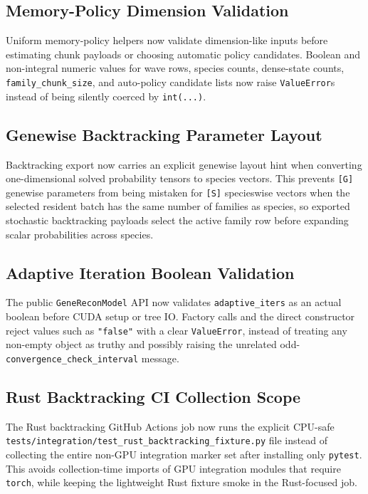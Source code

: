\documentclass[11pt]{article}
\begin{document}
\subsection{Memory-Policy Dimension Validation}

Uniform memory-policy helpers now validate dimension-like inputs before
estimating chunk payloads or choosing automatic policy candidates.  Boolean and
non-integral numeric values for wave rows, species counts, dense-state counts,
\texttt{family\_chunk\_size}, and auto-policy candidate lists now raise
\texttt{ValueError}s instead of being silently coerced by \texttt{int(...)}.

\subsection{Genewise Backtracking Parameter Layout}

Backtracking export now carries an explicit genewise layout hint when converting
one-dimensional solved probability tensors to species vectors.  This prevents
\texttt{[G]} genewise parameters from being mistaken for \texttt{[S]}
specieswise vectors when the selected resident batch has the same number of
families as species, so exported stochastic backtracking payloads select the
active family row before expanding scalar probabilities across species.

\subsection{Adaptive Iteration Boolean Validation}

The public \texttt{GeneReconModel} API now validates \texttt{adaptive\_iters}
as an actual boolean before CUDA setup or tree IO.  Factory calls and the direct
constructor reject values such as \texttt{"false"} with a clear
\texttt{ValueError}, instead of treating any non-empty object as truthy and
possibly raising the unrelated odd-\texttt{convergence\_check\_interval}
message.

\subsection{Rust Backtracking CI Collection Scope}

The Rust backtracking GitHub Actions job now runs the explicit CPU-safe
\texttt{tests/integration/test\_rust\_backtracking\_fixture.py} file instead of
collecting the entire non-GPU integration marker set after installing only
\texttt{pytest}.  This avoids collection-time imports of GPU integration modules
that require \texttt{torch}, while keeping the lightweight Rust fixture smoke in
the Rust-focused job.
\end{document}
